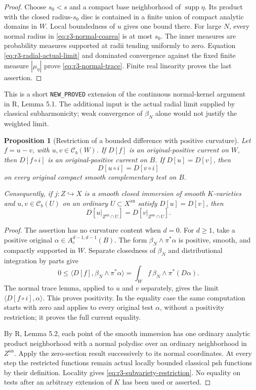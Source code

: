 \documentclass[11pt,a4paper]{article}
\numberwithin{equation}{section}
\newtheorem{proposition}[theorem]{Proposition}
\theoremstyle{definition}
\theoremstyle{remark}
\newcommand{\Cb}{\mathcal C_b}
\newcommand{\an}{\mathrm{an}}
\begin{document}
\begin{proof}
Choose $s_0<s$ and a compact base neighborhood of
$\operatorname{supp}\eta$. Its product with the closed
radius-$s_0$ disc is contained in a finite union of compact
analytic domains in $W$. Local boundedness of $u$ gives one
bound there. For large $N$, every normal radius in
\eqref{eq:r3-normal-coarea} is at most $s_0$.
The inner measures are probability measures supported at radii
tending uniformly to zero. Equation
\eqref{eq:r3-radial-actual-limit} and dominated convergence against
the fixed finite measure $|\mu_\eta|$ prove
\eqref{eq:r3-normal-trace}. Finite real linearity proves the
last assertion.
\end{proof}

This is a short \texttt{NEW\_PROVED} extension of the continuous
normal-kernel argument in \textup{R}, Lemma 5.1. The additional
input is the actual radial limit supplied by classical
subharmonicity; weak convergence of $\beta_N$ alone would not
justify the weighted limit.

\begin{proposition}[Restriction of a bounded difference with positive curvature]
\label{prop:r3-normal-restriction}
Let $f=u-v$, with $u,v\in\Cb(W)$. If $D[f]$ is an
original-positive current on $W$, then $D[f\circ i]$ is
an original-positive current on $B$. If $D[u]=D[v]$, then
\[
 D[u\circ i]=D[v\circ i]
\]
on every original compact smooth complementary test on $B$.

Consequently, if $j:Z\hookrightarrow X$ is a smooth closed
immersion of smooth $K$-varieties and $u,v\in\Cb(U)$ on an
ordinary $U\subset X^{\an}$ satisfy $D[u]=D[v]$, then
\begin{equation}
 D[u|_{Z^{\an}\cap U}]=D[v|_{Z^{\an}\cap U}].
 \label{eq:r3-subvariety-restriction}
\end{equation}
\end{proposition}

\begin{proof}
The assertion has no curvature content when $d=0$.
For $d\geq1$, take a positive original
$\alpha\in A_c^{d-1,d-1}(B)$. The form
$\beta_N\wedge\pi^*\alpha$ is positive, smooth, and compactly
supported in $W$. Separate closedness of $\beta_N$ and
distributional integration by parts give
\[
 0\leq\langle D[f],\beta_N\wedge\pi^*\alpha\rangle
   =\int_W f\,\beta_N\wedge\pi^*(D\alpha).
\]
The normal trace lemma, applied to $u$ and $v$ separately, gives
the limit $\langle D[f\circ i],\alpha\rangle$.
This proves positivity. In the equality case the same computation
starts with zero and applies to every original test $\alpha$,
without a positivity restriction; it proves the full current equality.

By \textup{R}, Lemma 5.2, each point of the smooth immersion
has one ordinary analytic product neighborhood with a normal
polydisc over an ordinary neighborhood in $Z^{\an}$.
Apply the zero-section result successively to its normal
coordinates. At every step the restricted functions remain actual
locally bounded classical psh functions by their definition.
Locality gives \eqref{eq:r3-subvariety-restriction}.
No equality on tests after an arbitrary extension of $K$ has been
used or asserted.
\end{proof}
\end{document}
